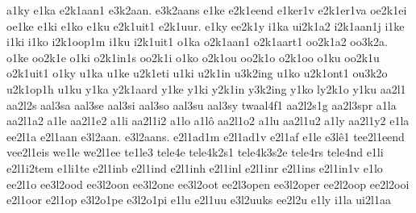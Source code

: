 {%
a1ky
%
e1ka
e2k1aan1
e3k2aan.
e3k2aans
e1ke
e2k1eend
e1ker1v
e2k1er1va
oe2k1ei
oe1ke
e1ki
e1ko
e1ku
e2k1uit1
e2k1uur.
e1ky
ee2k1y
%
i1ka
ui2k1a2
i2k1aan1j
i1ke
i1ki
i1ko
i2k1oop1m
i1ku
i2k1uit1
%
o1ka
o2k1aan1
o2k1aart1
oo2k1a2
oo3k2a.
o1ke
oo2k1e
o1ki
o2k1in1s
oo2k1i
o1ko
o2k1ou
oo2k1o
o2k1oo
o1ku
oo2k1u
o2k1uit1
o1ky
%
u1ka
u1ke
u2k1eti
u1ki
u2k1in
u3k2ing
u1ko
u2k1ont1
ou3k2o
u2k1op1h
u1ku
%
y1ka
y2k1aard
y1ke
y1ki
y2k1in
y3k2ing
y1ko
ly2k1o
y1ku
%
%
aa2l1
aa2l2s
aal3sa
aal3se
aal3si
aal3so
aal3su
aal3sy
twaal4f1
aa2l2s1g
aa2l3spr
a1la
aa2l1a2
a1le
aa2l1e2
a1li
aa2l1i2
a1lo
a1lô
aa2l1o2
a1lu
aa2l1u2
a1ly
aa2l1y2
%
%
e1la
ee2l1a
e2l1aan
e3l2aan.
e3l2aans.
e2l1ad1m
e2l1ad1v
e2l1af
e1le
e3lê1
tee2l1eend
vee2l1eis
we1le
we2l1ee
te1le3
tele4e
tele4k2s1
tele4k3s2e
tele4rs
tele4nd
e1li
e2l1i2tem
e1li1te
e2l1inb
e2l1ind
e2l1inh
e2l1inl
e2l1inr
e2l1ins
e2l1in1v
e1lo
ee2l1o
ee3l2ood
ee3l2oon
ee3l2one
ee3l2oot
ee2l3open
ee3l2oper
ee2l2oop
ee2l2ooi
e2l1oor
e2l1op
e3l2o1pe
e3l2o1pi
e1lu
e2l1uu
e3l2uuks
ee2l2u
e1ly
%
i1la
ui2l1aa
}

